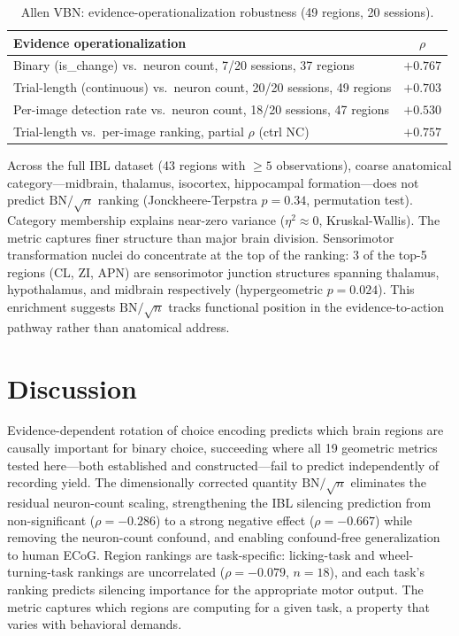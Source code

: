 \documentclass[9pt,lineno]{elife}
\begin{document}
\begin{table}[t]
\centering
\caption{Allen VBN: evidence-operationalization robustness (49 regions, 20 sessions).}
\label{tab:allen}
\small
\begin{tabular}{lc}
\toprule
Evidence operationalization & $\rho$ \\
\midrule
Binary (is\_change) vs.\ neuron count, 7/20 sessions, 37 regions & $+0.767$ \\
Trial-length (continuous) vs.\ neuron count, 20/20 sessions, 49 regions & $+0.703$ \\
Per-image detection rate vs.\ neuron count, 18/20 sessions, 47 regions & $+0.530$ \\
\midrule
Trial-length vs.\ per-image ranking, partial $\rho$ (ctrl NC) & $\mathbf{+0.757}$ \\
\bottomrule
\end{tabular}
\end{table}

Across the full IBL dataset (43 regions with $\geq 5$ observations), coarse anatomical category---midbrain, thalamus, isocortex, hippocampal formation---does not predict $\text{BN}/\!\sqrt{n}$ ranking (Jonckheere-Terpstra $p = 0.34$, permutation test). Category membership explains near-zero variance ($\eta^2 \approx 0$, Kruskal-Wallis). The metric captures finer structure than major brain division. Sensorimotor transformation nuclei do concentrate at the top of the ranking: 3 of the top-5 regions (CL, ZI, APN) are sensorimotor junction structures spanning thalamus, hypothalamus, and midbrain respectively (hypergeometric $p = 0.024$). This enrichment suggests $\text{BN}/\!\sqrt{n}$ tracks functional position in the evidence-to-action pathway rather than anatomical address.


\section{Discussion}

Evidence-dependent rotation of choice encoding predicts which brain regions are causally important for binary choice, succeeding where all 19 geometric metrics tested here---both established and constructed---fail to predict independently of recording yield. The dimensionally corrected quantity $\text{BN}/\!\sqrt{n}$ eliminates the residual neuron-count scaling, strengthening the IBL silencing prediction from non-significant ($\rho = -0.286$) to a strong negative effect ($\rho = -0.667$) while removing the neuron-count confound, and enabling confound-free generalization to human ECoG. Region rankings are task-specific: licking-task and wheel-turning-task rankings are uncorrelated ($\rho = -0.079$, $n = 18$), and each task's ranking predicts silencing importance for the appropriate motor output. The metric captures which regions are computing for a given task, a property that varies with behavioral demands.
\end{document}
